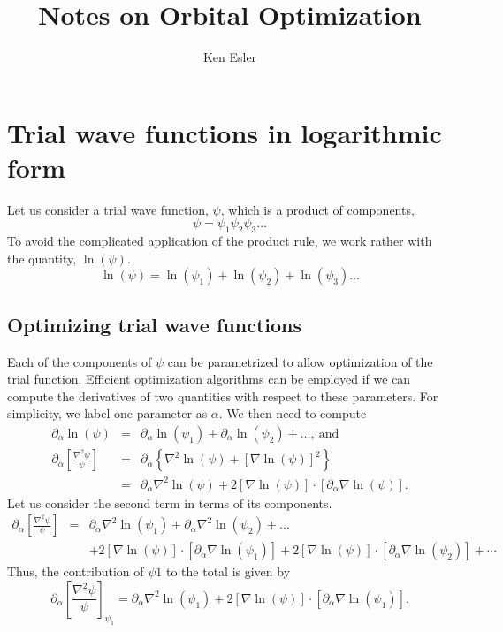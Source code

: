 \documentclass[letterpaper]{article}
\title{Notes on Orbital Optimization}
\author{Ken Esler}
\begin{document}
\maketitle
\newcommand{\vr}{\mathbf{r}}
\newcommand{\Aopt}{\tilde{A}}

\section{Trial wave functions in logarithmic form}
Let us consider a trial wave function, $\psi$, which is a product of
components,
\begin{equation}
  \psi = \psi_1 \psi_2 \psi_3 \dots
\end{equation}
To avoid the complicated application of the product rule, we work
rather with the quantity, $\ln(\psi)$.
\begin{equation}
\ln(\psi) = \ln(\psi_1) + \ln(\psi_2) + \ln(\psi_3) \dots
\end{equation}
\subsection{Optimizing trial wave functions}
Each of the components of $\psi$ can be parametrized to allow
optimization of the trial function.  Efficient optimization algorithms
can be employed if we can compute the derivatives of two quantities
with respect to these parameters.  For simplicity, we label one
parameter as $\alpha$.  We then need to compute
\begin{eqnarray}
\partial_\alpha \ln(\psi) & = & \partial_\alpha \ln (\psi_1)
+ \partial_\alpha \ln (\psi_2) + \dots,\ \text{and} \\
\partial_\alpha \left[ \frac{\nabla^2\psi}{\psi}\right] & = &
\partial_\alpha \left\{\nabla^2 \ln(\psi) + \left[\nabla
    \ln(\psi)\right]^2 \right\} \\
& = & \partial_\alpha \nabla^2 \ln(\psi) + 2 \left[\nabla \ln(\psi)
\right]\cdot \left[ \partial_\alpha \nabla \ln(\psi)\right].
\end{eqnarray}
Let us consider the second term in terms of its components.
\begin{eqnarray}
\partial_\alpha \left[ \frac{\nabla^2\psi}{\psi}\right] & = &
 \partial_\alpha \nabla^2\ln(\psi_1) + \partial_\alpha
 \nabla^2\ln(\psi_2)+ \dots \\
& & + 2\left[\nabla \ln(\psi)\right]\cdot
\left[\partial_\alpha \nabla \ln(\psi_1)\right] +
2\left[\nabla \ln(\psi)\right]\cdot
\left[\partial_\alpha \nabla \ln(\psi_2)\right] + \cdots \nonumber
\end{eqnarray}
Thus, the contribution of $\psi1$ to the total is given by
\begin{equation}
\partial_\alpha \left[ \frac{\nabla^2\psi}{\psi}\right]_{\psi_1} =
\partial_\alpha \nabla^2\ln(\psi_1) + 2\left[\nabla \ln(\psi)\right]\cdot
\left[\partial_\alpha \nabla \ln(\psi_1)\right].
\end{equation}
\end{document}
